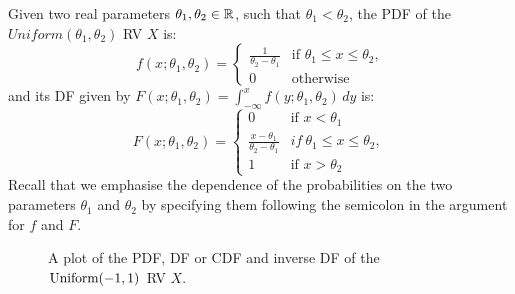 \begin{model}\label{M:Uniformab}
Given two real parameters $\theta_1,\theta_2 \in \mathbb{R}$, such that $\theta_1 < \theta_2$, the PDF of the $Uniform(\theta_1,\theta_2)$ RV $X$ is:
\begin{equation}\label{E:Uniformabpdf}
f(x;\theta_1,\theta_2) =
\begin{cases}
\frac{1}{\theta_2 - \theta_1} & \text{if $\theta_1 \leq x \leq \theta_2$,}\\
0 & \text{otherwise}
\end{cases}
\end{equation}
and its DF given by $F(x;\theta_1,\theta_2) = \int_{- \infty}^x f(y; \theta_1,\theta_2) \, dy$ is:
\begin{equation}\label{E:Uniformabcdf}
F(x; \theta_1,\theta_2) =
\begin{cases}
0 & \text{if $x < \theta_1$} \\
\frac{x-\theta_1}{\theta_2-\theta_1} & if~\theta_1 \leq x \leq \theta_2,\\
1 & \text{if $x > \theta_2$}
\end{cases}
\end{equation}
Recall that we emphasise the dependence of the probabilities on the two parameters $\theta_1$ and $\theta_2$ by specifying them following the semicolon in the argument for $f$ and $F$.
\end{model}
\begin{figure}[htpb]
\caption{A plot of the PDF, DF or CDF and inverse DF of the $\mbox{{\rm Uniform}}(-1,1)$ RV $X$.\label{F:unifpm1}}
\centering   {}
\end{figure}

